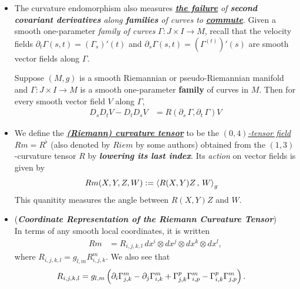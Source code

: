\documentclass[11pt]{article}
\begin{document}
\begin{itemize}
\item \begin{remark}
The curvature endomorphism also measures \emph{\underline{\textbf{the failure}} of \textbf{second covariant derivatives} along \textbf{families} of curves to \underline{\textbf{commute}}}. Given a smooth one-parameter \emph{family of curves} $\Gamma: J \times I \rightarrow M$, recall that the velocity fields $\partial_{t}\Gamma(s,t) = (\Gamma_s)'(t)$ and $\partial_{s}\Gamma(s,t) = (\Gamma^{(t)})'(s)$ are smooth vector fields along $\Gamma$.

\begin{proposition}
Suppose $(M,g)$  is a smooth Riemannian or pseudo-Riemannian manifold and  $\Gamma: J \times I \rightarrow M$  is a smooth one-parameter \textbf{family} of curves in $M$.
Then for every smooth vector field $V$ along $\Gamma$,
\begin{align}
D_{s}D_{t}V - D_{t}D_{s}V &= R(\partial_s\,\Gamma, \partial_t\,\Gamma)V  \label{eqn: rieman_curvature_2nd_covariant_deriv_not_commute}
\end{align}
\end{proposition}
\end{remark}

\item \begin{definition}
We define the \underline{\emph{\textbf{(Riemann) curvature tensor}}} to be the \underline{\emph{$(0,4)$-tensor field}} $Rm = R^{\flat}$ (also denoted by
$Riem$ by some authors) obtained from the $(1,3)$-curvature tensor $R$ by \emph{\textbf{lowering its last index}}. Its \emph{action} on vector fields is given by
\begin{align}
Rm(X, Y, Z, W) &:= \left\langle R(X, Y)Z\,,\, W \right\rangle_{g} \label{eqn: rieman_curvature_tensor_on_vector_field}
\end{align} This quanitity measures the angle between $R(X, Y)Z$ and $W$.
\end{definition}

\item \begin{remark} (\emph{\textbf{Coordinate Representation of the Riemann Curvature Tensor}})\\
In terms of any smooth local coordinates, it is written
\begin{align*}
Rm &= R_{i,j,k,l}\,dx^i \otimes dx^j \otimes dx^k \otimes dx^l,
\end{align*}
where $ R_{i,j,k,l} = g_{l,m}R_{i,j,k}^{m}$.  We also see that 
\begin{align}
R_{i,j,k,l} &= g_{l,m}\left(\partial_i \Gamma_{j,k}^{m} -\partial_j \Gamma_{i,k}^{m} + \Gamma_{j,k}^{p}\Gamma_{i,p}^{m}- \Gamma_{i,k}^{p}\Gamma_{j,p}^{m}\right). \label{eqn: rieman_curvature_tensor_coefficient}
\end{align}
\end{remark}


\end{itemize}
\end{document}
